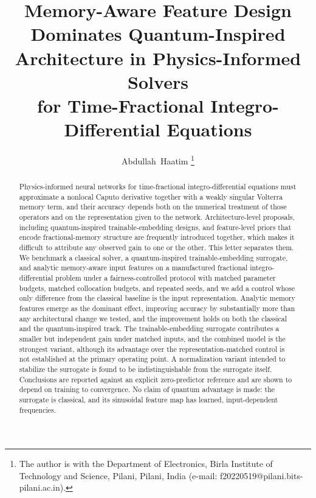 \documentclass[journal]{IEEEtran}
\begin{document}
\title{Memory-Aware Feature Design Dominates Quantum-Inspired\\
Architecture in Physics-Informed Solvers\\
for Time-Fractional Integro-Differential Equations}

\author{Abdullah~Haatim%
\thanks{The author is with the Department of Electronics, Birla Institute of
Technology and Science, Pilani, Pilani, India
(e-mail: f20220519@pilani.bits-pilani.ac.in).}}

\maketitle

\begin{abstract}
Physics-informed neural networks for time-fractional integro-differential
equations must approximate a nonlocal Caputo derivative together with a weakly
singular Volterra memory term, and their accuracy depends both on the numerical
treatment of those operators and on the representation given to the network.
Architecture-level proposals, including quantum-inspired trainable-embedding
designs, and feature-level priors that encode fractional-memory structure are
frequently introduced together, which makes it difficult to attribute any observed
gain to one or the other. This letter separates them. We benchmark a classical
solver, a quantum-inspired trainable-embedding surrogate, and analytic
memory-aware input features on a manufactured fractional integro-differential
problem under a fairness-controlled protocol with matched parameter budgets,
matched collocation budgets, and repeated seeds, and we add a control whose only
difference from the classical baseline is the input representation. Analytic
memory features emerge as the dominant effect, improving accuracy by substantially
more than any architectural change we tested, and the improvement holds on both
the classical and the quantum-inspired track. The trainable-embedding surrogate
contributes a smaller but independent gain under matched inputs, and the combined
model is the strongest variant, although its advantage over the
representation-matched control is not established at the primary operating point.
A normalization variant intended to stabilize the surrogate is found to be
indistinguishable from the surrogate itself. Conclusions are reported against an
explicit zero-predictor reference and are shown to depend on training to
convergence. No claim of quantum advantage is made: the surrogate is classical,
and its sinusoidal feature map has learned, input-dependent frequencies.
\end{abstract}
\end{document}
